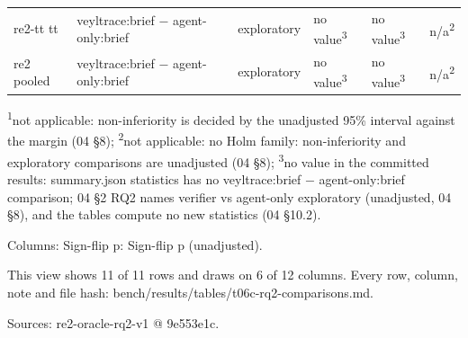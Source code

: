 \begin{table}[t]
\begin{tabularx}{\linewidth}{@{}l>{\raggedright\arraybackslash}X>{\raggedright\arraybackslash}Xlll@{}}
re2-tt tt & veyltrace:brief $-$ agent-only:brief & exploratory & no value\textsuperscript{3} & no value\textsuperscript{3} & n/a\textsuperscript{2} \\
re2 pooled & veyltrace:brief $-$ agent-only:brief & exploratory & no value\textsuperscript{3} & no value\textsuperscript{3} & n/a\textsuperscript{2} \\
\hline
\end{tabularx}
\par\smallskip\scriptsize\raggedright
\textsuperscript{1}not applicable: non-inferiority is decided by the unadjusted 95\% interval against the margin (04 \S{}8); \textsuperscript{2}not applicable: no Holm family: non-inferiority and exploratory comparisons are unadjusted (04 \S{}8); \textsuperscript{3}no value in the committed results: summary.json statistics has no veyltrace:brief $-$ agent-only:brief comparison; 04 \S{}2 RQ2 names verifier vs agent-only exploratory (unadjusted, 04 \S{}8), and the tables compute no new statistics (04 \S{}10.2).\par
Columns: Sign-flip p: Sign-flip p (unadjusted).\par
This view shows 11 of 11 rows and draws on 6 of 12 columns. Every row, column, note and file hash: bench/\allowbreak{}results/\allowbreak{}tables/\allowbreak{}t06c-rq2-comparisons.md.\par
Sources: re2-oracle-rq2-v1 @ 9e553e1c.\par
\end{table}
